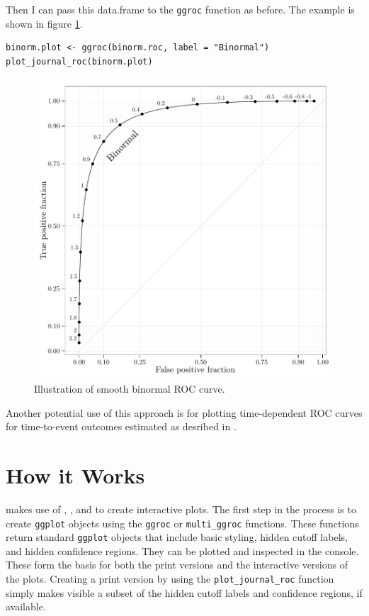 \documentclass[article]{jss}
\begin{document}
Then I can pass this data.frame to the \texttt{ggroc} function as
before. The example is shown in figure \ref{binorm}.

\begin{verbatim}
binorm.plot <- ggroc(binorm.roc, label = "Binormal")
plot_journal_roc(binorm.plot)
\end{verbatim}

\begin{figure}[htbp]
\centering
\includegraphics{figure/binormal-1.pdf}
\caption{Illustration of smooth binormal ROC curve. \label{binorm}}
\end{figure}

Another potential use of this approach is for plotting time-dependent
ROC curves for time-to-event outcomes estimated as desribed in
\citep{heagerty2000time}.

\section{How it Works}\label{how-it-works}

 makes use of  \citep{ggplot2}, 
\citep{gridsvg}, and  \citep{bostock2011d3} to create
interactive plots. The first step in the process is to create
\texttt{ggplot} objects using the \texttt{ggroc} or
\texttt{multi\_ggroc} functions. These functions return standard
\texttt{ggplot} objects that include basic styling, hidden cutoff
labels, and hidden confidence regions. They can be plotted and inspected
in the  console. These form the basis for both the print
versions and the interactive versions of the plots. Creating a print
version by using the \texttt{plot\_journal\_roc} function simply makes
visible a subset of the hidden cutoff labels and confidence regions, if
available.
\end{document}

